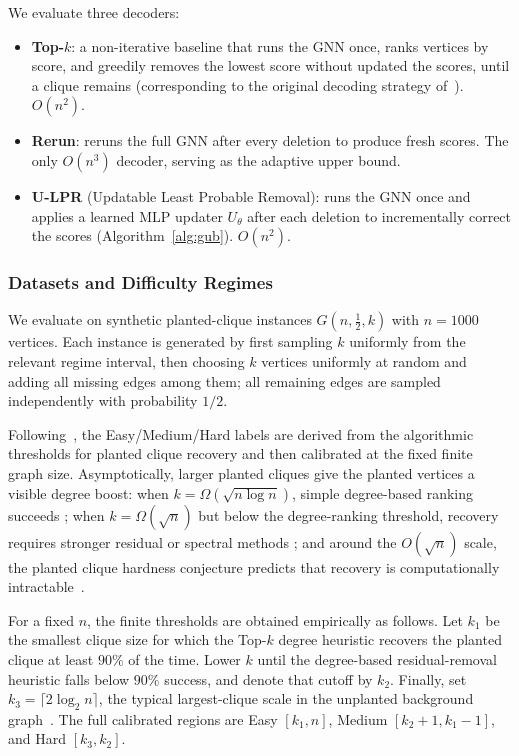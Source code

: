 \documentclass[mathematics,article,submit,pdftex,moreauthors]{Definitions/mdpi}
\begin{document}
We evaluate three decoders:
\begin{itemize}
  \item \textbf{Top-$k$}: a non-iterative baseline that runs the GNN once, ranks
    vertices by score, and greedily removes the lowest score without updated the scores, until a clique remains (corresponding to the original decoding strategy
    of~\citet{karalias2020}). $O(n^2)$.
  \item \textbf{Rerun}: reruns the full GNN after every deletion to produce fresh
    scores. The only $O(n^3)$ decoder, serving as the adaptive upper bound.
  \item \textbf{U-LPR} (Updatable Least Probable Removal): runs the GNN once and
    applies a learned MLP updater $U_\theta$ after each deletion to incrementally
    correct the scores (Algorithm~\ref{alg:gub}). $O(n^2)$.
\end{itemize}

\subsubsection{Datasets and Difficulty Regimes}

We evaluate on synthetic planted-clique instances $G(n,\tfrac{1}{2},k)$ with
$n=1000$ vertices. Each instance is generated by first sampling $k$ uniformly from
the relevant regime interval, then choosing $k$ vertices uniformly at random and
adding all missing edges among them; all remaining edges are sampled independently
with probability $1/2$.

Following~\citet{ShohamHRV26}, the Easy/Medium/Hard labels are derived from the
algorithmic thresholds for planted clique recovery and then calibrated at the fixed
finite graph size. Asymptotically, larger planted cliques give the planted vertices
a visible degree boost: when $k=\Omega(\sqrt{n\log n})$, simple degree-based
ranking succeeds \cite{kucera1995}; when $k=\Omega(\sqrt n)$ but below the degree-ranking threshold,
recovery requires stronger residual or spectral methods \cite{alon1998,feige2020hide}; and around the
$O(\sqrt n)$ scale, the planted clique hardness conjecture predicts that recovery
is computationally intractable~\cite{manurangsi2021,hajek2015,ma2015computational,berthet2013complexity,hazan2011hardness}.

For a fixed $n$, the finite thresholds are obtained empirically as follows. Let
$k_1$ be the smallest clique size for which the Top-$k$ degree heuristic recovers
the planted clique at least $90\%$ of the time. Lower $k$ until the degree-based
residual-removal heuristic falls below $90\%$ success, and denote that cutoff by
$k_2$. Finally, set
$k_3=\lceil 2\log_2 n\rceil$, the typical largest-clique scale in the unplanted
background graph~\citep{bollobas1985}. The full calibrated regions are Easy
$[k_1,n]$, Medium $[k_2+1,k_1-1]$, and Hard $[k_3,k_2]$.
\end{document}
